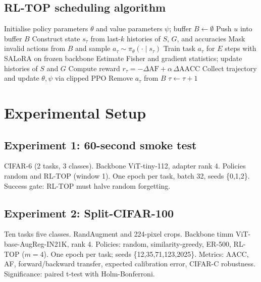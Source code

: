 \documentclass{article}
\begin{document}
\subsection{RL-TOP scheduling algorithm}
\begin{algorithm}
\caption{RL-TOP Task Scheduling with SALoRA}
\begin{algorithmic}[1]
  \State Initialise policy parameters $\theta$ and value parameters $\psi$; buffer $B \leftarrow \emptyset$
    \State Push $u$ into buffer $B$
      \State Construct state $s_{\tau}$ from last-$k$ histories of $S$, $G$, and accuracies
      \State Mask invalid actions from $B$ and sample $a_{\tau} \sim \pi_{\theta}(\cdot\mid s_{\tau})$
      \State Train task $a_{\tau}$ for $E$ steps with SALoRA on frozen backbone
      \State Estimate Fisher and gradient statistics; update histories of $S$ and $G$
      \State Compute reward $r_{\tau} = -\Delta\mathrm{AF} + \alpha\,\Delta\mathrm{AACC}$
      \State Collect trajectory and update $\theta, \psi$ via clipped PPO
        \State Remove $a_{\tau}$ from $B$
      \EndIf
      \State $\tau \leftarrow \tau + 1$
    \EndWhile
  \EndFor
\end{algorithmic}
\end{algorithm}

\section{Experimental Setup}
\subsection{Experiment 1: 60-second smoke test}
CIFAR-6 (2 tasks, 3 classes). Backbone ViT-tiny-112, adapter rank 4. Policies random and RL-TOP (window 1). One epoch per task, batch 32, seeds \{0,1,2\}. Success gate: RL-TOP must halve random forgetting.

\subsection{Experiment 2: Split-CIFAR-100}
Ten tasks \times five classes. RandAugment and 224-pixel crops. Backbone timm ViT-base-AugReg-IN21K, rank 4. Policies: random, similarity-greedy, ER-500, RL-TOP ($m = 4$). One epoch per task; seeds \{12,35,71,123,2025\}. Metrics: AACC, AF, forward/backward transfer, expected calibration error, CIFAR-C robustness. Significance: paired t-test with Holm-Bonferroni.
\end{document}
